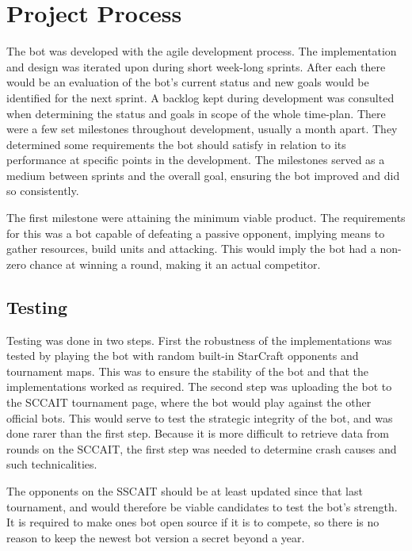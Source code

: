 \chapter{Project Process}
The bot was developed with the agile development process. The implementation and design was iterated upon during short week-long sprints. After each there would be an evaluation of the bot's current status and new goals would be identified for the next sprint. A backlog kept during development was consulted when determining the status and goals in scope of the whole time-plan. There were a few set milestones throughout development, usually a month apart. They determined some requirements the bot should satisfy in relation to its performance at specific points in the development. The milestones served as a medium between sprints and the overall goal, ensuring the bot improved and did so consistently.

The first milestone were attaining the minimum viable product. The requirements for this was a bot capable of defeating a passive opponent, implying means to gather resources, build units and attacking. This would imply the bot had a non-zero chance at winning a round, making it an actual competitor.



\section{Testing}
Testing was done in two steps. First the robustness of the implementations was tested by playing the bot with random built-in StarCraft opponents and tournament maps. This was to ensure the stability of the bot and that the implementations worked as required. The second step was uploading the bot to the SCCAIT tournament page, where the bot would play against the other official bots. This would serve to test the strategic integrity of the bot, and was done rarer than the first step. Because it is more difficult to retrieve data from rounds on the SCCAIT, the first step was needed to determine crash causes and such technicalities.

The opponents on the SSCAIT should be at least updated since that last tournament, and would therefore be viable candidates to test the bot's strength. It is required to make ones bot open source if it is to compete, so there is no reason to keep the newest bot version a secret beyond a year.